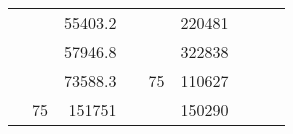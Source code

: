 \begin{table}[H]
\begin{tabular}{|ccrccrccc}
\multicolumn{1}{|c|}{\cellcolor[HTML]{FFFFC7}}                                & \multicolumn{1}{c|}{\cellcolor[HTML]{DAE8FC}}                      & \multicolumn{1}{r|}{\cellcolor[HTML]{DAE8FC}55403.2}   & \multicolumn{1}{c|}{\cellcolor[HTML]{FFFFC7}}                                & \multicolumn{1}{c|}{\cellcolor[HTML]{DAE8FC}}                       & \multicolumn{1}{r|}{\cellcolor[HTML]{DDFDFF}220481}    &                                                                              &                                                                    &                                                        \\ \cline{3-3} \cline{6-6}
\multicolumn{1}{|c|}{\cellcolor[HTML]{FFFFC7}}                                & \multicolumn{1}{c|}{\cellcolor[HTML]{DAE8FC}}                      & \multicolumn{1}{r|}{\cellcolor[HTML]{DDFDFF}57946.8}   & \multicolumn{1}{c|}{\cellcolor[HTML]{FFFFC7}}                                & \multicolumn{1}{c|}{\cellcolor[HTML]{DAE8FC}}                       & \multicolumn{1}{r|}{\cellcolor[HTML]{DAE8FC}322838}    &                                                                              &                                                                    &                                                        \\ \cline{3-3} \cline{6-6}
\multicolumn{1}{|c|}{\cellcolor[HTML]{FFFFC7}}                                & \multicolumn{1}{c|}{\cellcolor[HTML]{DAE8FC}}                      & \multicolumn{1}{r|}{\cellcolor[HTML]{DAE8FC}73588.3}   & \multicolumn{1}{c|}{\cellcolor[HTML]{FFFFC7}}                                & \multicolumn{1}{c|}{\multirow{-10}{*}{\cellcolor[HTML]{DAE8FC}75}}  & \multicolumn{1}{r|}{\cellcolor[HTML]{DDFDFF}110627}    &                                                                              &                                                                    &                                                        \\ \cline{3-3} \cline{5-6}
\multicolumn{1}{|c|}{\cellcolor[HTML]{FFFFC7}}                                & \multicolumn{1}{c|}{\multirow{-10}{*}{\cellcolor[HTML]{DAE8FC}75}} & \multicolumn{1}{r|}{\cellcolor[HTML]{DDFDFF}151751}    & \multicolumn{1}{c|}{\cellcolor[HTML]{FFFFC7}}                                & \multicolumn{1}{c|}{\cellcolor[HTML]{DDFDFF}}                       & \multicolumn{1}{r|}{\cellcolor[HTML]{DAE8FC}150290}    &                                                                              &                                                                    &                                                        \\ \cline{2-3} \cline{6-6}

\end{tabular}
\end{table}
